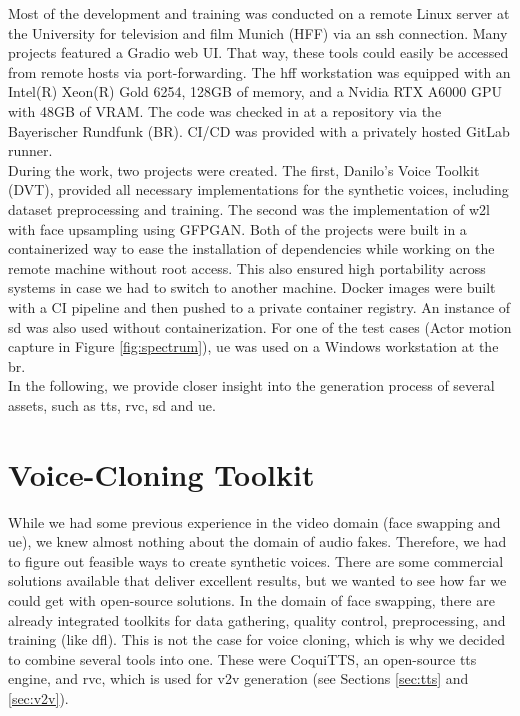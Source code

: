 \documentclass[
  a4paper,  %
  twoside,  %
  bibliography=totoc,
  headsepline,
  cleardoublepage=empty,
  parskip=half,
  draft=false
]{scrbook}
\begin{document}
Most of the development and training was conducted on a remote Linux server at the University for television and film Munich (HFF) via an \gls{ssh} connection. Many projects featured a Gradio web UI. That way, these tools could easily be accessed from remote hosts via port-forwarding. The \gls{hff} workstation was equipped with an Intel(R) Xeon(R) Gold 6254, 128GB of memory, and a Nvidia RTX A6000 GPU with 48GB of VRAM. The code was checked in at a repository via the Bayerischer Rundfunk (BR). CI/CD was provided with a privately hosted GitLab runner. \\
During the work, two projects were created. The first, Danilo's Voice Toolkit (DVT), provided all necessary implementations for the synthetic voices, including dataset preprocessing and training. The second was the implementation of \gls{w2l} with face upsampling using GFPGAN. Both of the projects were built in a containerized way to ease the installation of dependencies while working on the remote machine without root access. This also ensured high portability across systems in case we had to switch to another machine. Docker images were built with a CI pipeline and then pushed to a private container registry. An instance of \gls{sd} was also used without containerization. For one of the test cases (Actor motion capture in Figure \ref{fig:spectrum}), \gls{ue} was used on a Windows workstation at the \gls{br}. \\
In the following, we provide closer insight into the generation process of several assets, such as \gls{tts}, \gls{rvc}, \gls{sd} and \gls{ue}.

\section{Voice-Cloning Toolkit}
\label{sec:dvt}
While we had some previous experience in the video domain (face swapping and \gls{ue}), we knew almost nothing about the domain of audio fakes. Therefore, we had to figure out feasible ways to create synthetic voices. There are some commercial solutions available that deliver excellent results, but we wanted to see how far we could get with open-source solutions. In the domain of face swapping, there are already integrated toolkits for data gathering, quality control, preprocessing, and training (like \gls{dfl}). This is not the case for voice cloning, which is why we decided to combine several tools into one. These were CoquiTTS, an open-source \gls{tts} engine, and \gls{rvc}, which is used for \gls{v2v} generation (see Sections \ref{sec:tts} and \ref{sec:v2v}). 
\end{document}
